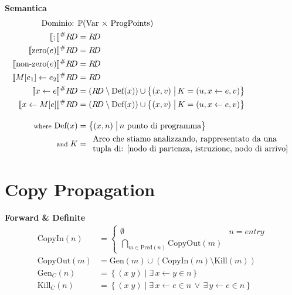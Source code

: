 \documentclass[a4paper,12pt,openany]{article}
\newcommand{\RD}{R\!D}
\begin{document}
    \textbf{Semantica}
    \begin{align*}
        \mbox{Dominio: }& \mathbb{P}(\mbox{Var $\times$ ProgPoints})\\
        \llbracket ; \rrbracket^\#\RD &= \RD\\
        \llbracket \mbox{zero}(e) \rrbracket^\#\RD &= \RD\\
        \llbracket \mbox{non-zero}(e) \rrbracket^\#\RD &= \RD\\
        \llbracket M[e_1]\leftarrow e_2 \rrbracket^\#\RD &= \RD\\
        \llbracket x \leftarrow e \rrbracket^\#\RD &= (\RD\setminus \mbox{Def}(x)) \cup
        \left\{
            (x, v) \;\big\vert\, K = (u, x\leftarrow e, v)
        \right\}\\
        \llbracket x\leftarrow M[e] \rrbracket^\#\RD &= (\RD\setminus \mbox{Def}(x)) \cup
        \left\{
        (x, v) \;\big\vert\, K = (u, x\leftarrow e, v)
        \right\}\\[1em]
        \mbox{{\footnotesize where} Def}(x) &=
        \left\{
            (x, n) \;\big\vert\, n \mbox{ punto di programma}
        \right\}\\
        \mbox{\footnotesize and } K &= 
        \begin{array}{ll}
            \mbox{Arco che stiamo analizzando, rappresentato da una}\\
            \mbox{tupla di: [nodo di partenza, istruzione, nodo di arrivo]}
        \end{array}
    \end{align*}


    \section*{Copy Propagation}
    \textbf{Forward \& Definite}
    \begin{align*}
        \mbox{CopyIn}(n) &=
        \begin{cases}
        \emptyset & n = entry\\
        \bigcap\limits_{m\in \mbox{Pred}(n)} \mbox{CopyOut}(m)
        \end{cases}\\
        \mbox{CopyOut}(m) &= \mbox{Gen}(m) \cup (\mbox{CopyIn}(m) \setminus \mbox{Kill}(m))\\
        \mbox{Gen}_{C}(n) &= \left\{
        (x\; y) \;\big\vert\; \exists\, x\leftarrow y \in n
        \right\}\\
        \mbox{Kill}_{C}(n) &= \left\{
        (x\; y) \;\big\vert\; \exists\, x\leftarrow e \in n \,\lor\, \exists\, y\leftarrow e \in n
        \right\}
    \end{align*}
    
\end{document}
